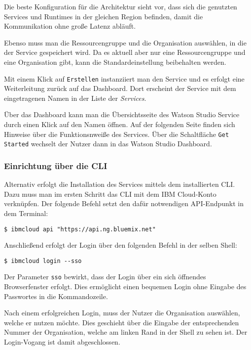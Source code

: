 Die beste Konfiguration für die Architektur sieht vor, dass sich die genutzten Services und Runtimes in der gleichen
Region befinden, damit die Kommunikation ohne große Latenz abläuft.

Ebenso muss man die Ressourcengruppe und die Organisation auswählen, in die der Service gespeichert wird. Da es aktuell
aber nur eine Ressourcengruppe und eine Organisation gibt, kann die Standardeinstellung beibehalten werden.

Mit einem Klick auf \texttt{Erstellen} instanziiert man den Service und es erfolgt eine Weiterleitung zurück auf das
Dashboard. Dort erscheint der Service mit dem eingetragenen Namen in der Liste der \textit{Services}.

Über das Dashboard kann man die Übersichtsseite des Watson Studio Service durch einen Klick auf den Namen öffnen. Auf
der folgenden Seite finden sich Hinweise über die Funktionsnweiße des Services. Über die Schaltfläche
\texttt{Get Started} wechselt der Nutzer dann in das Watson Studio Dashboard.

\subsubsection{Einrichtung über die CLI}
Alternativ erfolgt die Installation des Services mittels dem installierten CLI. Dazu muss man im ersten Schritt das CLI
mit dem IBM Cloud-Konto verknüpfen. Der folgende Befehl setzt den dafür notwendigen API-Endpunkt in dem Terminal:

\begin{lstlisting}[caption=Setzen des API-Endpunktes, label=ls:vorbereitung_apiendpunkt]
    $ ibmcloud api "https://api.ng.bluemix.net"
\end{lstlisting}

Anschließend erfolgt der Login über den folgenden Befehl in der selben Shell:

\begin{lstlisting}[caption=Login über CLI und Single Sign-on, label=ls:vorbereitung_login]
    $ ibmcloud login --sso
\end{lstlisting}

Der Parameter \texttt{sso} bewirkt, dass der Login über ein sich öffnendes Browserfenster erfolgt. Dies ermöglicht einen
bequemen Login ohne Eingabe des Passwortes in die Kommandozeile.

Nach einem erfolgreichen Login, muss der Nutzer die Organisation auswählen, welche er nutzen möchte. Dies geschieht über
die Eingabe der entsprechenden Nummer der Organisation, welche am linken Rand in der Shell zu sehen ist. Der
Login-Vogang ist damit abgeschlossen.

